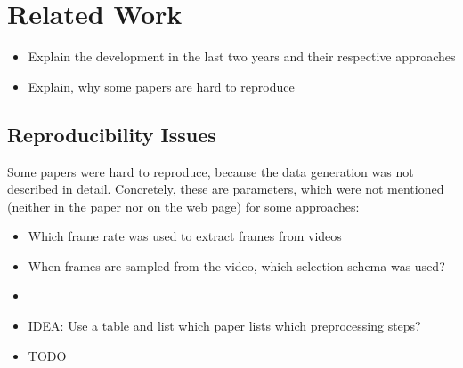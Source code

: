 \section{Related Work}
\label{sec:related}


\begin{itemize}
	\item Explain the development in the last two years and their respective approaches
	\item Explain, why some papers are hard to reproduce
\end{itemize}

\subsection*{Reproducibility Issues}
Some papers were hard to reproduce, because the data generation was not described in detail.
Concretely, these are parameters, which were not mentioned (neither in the paper nor on the web page) for some approaches:
\begin{itemize}
	\item Which frame rate was used to extract frames from videos
	\item When frames are sampled from the video, which selection schema was used?
	\item
	\item IDEA: Use a table and list which paper lists which preprocessing steps?
	\item TODO
\end{itemize}
